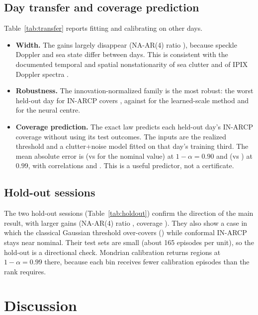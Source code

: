 \subsection{Day transfer and coverage prediction}
Table~\ref{tab:transfer} reports fitting and calibrating on other days.
\begin{itemize}[leftmargin=*,itemsep=1pt]
\item \textbf{Width.} The gains largely disappear (NA-AR(4) ratio \TrRatioNAFour), because speckle Doppler and sea state differ between days. This is consistent with the documented temporal and spatial nonstationarity of sea clutter and of IPIX Doppler spectra \cite{greco2010,rosenberg2017}.
\item \textbf{Robustness.} The innovation-normalized family is the most robust: the worst held-out day for IN-ARCP covers \TrWorstINOne, against \TrWorstLS{} for the learned-scale method and \TrWorstMLP{} for the neural centre.
\item \textbf{Coverage prediction.} The exact law predicts each held-out day's IN-ARCP coverage without using its test outcomes. The inputs are the realized threshold and a clutter+noise model fitted on that day's training third. The mean absolute error is \CFiveMaeA{} (vs \CFiveNaiveA{} for the nominal value) at $1-\alpha=0.90$ and \CFiveMaeB{} (vs \CFiveNaiveB) at $0.99$, with correlations \CFiveCorrA{} and \CFiveCorrB. This is a useful predictor, not a certificate.
\end{itemize}

\subsection{Hold-out sessions}
The two hold-out sessions (Table~\ref{tab:holdout}) confirm the direction of the main result, with larger gains (NA-AR(4) ratio \HoRatioNAFour, coverage \HoCovNAFour). They also show a case in which the classical Gaussian threshold over-covers (\HoCovGOne) while conformal IN-ARCP stays near nominal. Their test sets are small (about 165 episodes per unit), so the hold-out is a directional check. Mondrian calibration returns \HoMonInf{} regions at $1-\alpha=0.99$ there, because each bin receives fewer calibration episodes than the rank requires.

\section{Discussion}

